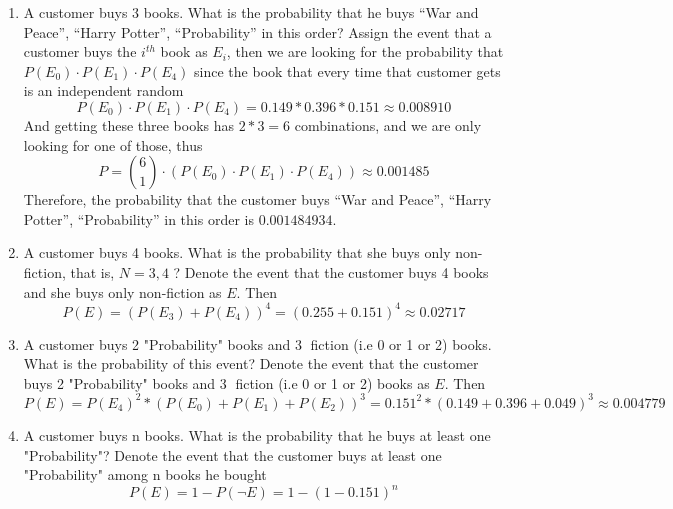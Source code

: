 \documentclass[preprint,12pt]{elsarticle}
\begin{document}
\begin{enumerate}[label=\alph*]
    \item A customer buys 3 books. What is the probability that he buys “War and Peace”, “Harry Potter”, 
    “Probability” in this order?
    Assign the event that a customer buys the $i^{th}$ book as $E_i$, then we are looking for the probability
    that $P(E_0) \cdot P(E_1) \cdot P(E_4)$ since the book that every time that customer gets is an independent random
    \begin{equation*}
        P(E_0) \cdot P(E_1) \cdot P(E_4) = 0.149 * 0.396 * 0.151 \approx 0.008910
    \end{equation*}
    And getting these three books has $2 * 3 = 6$ combinations, and we are only looking for one of those, thus
    \begin{equation*}
        P = \binom{6}{1} \cdot (P(E_0) \cdot P(E_1) \cdot P(E_4)) \approx 0.001485
    \end{equation*}
    Therefore, the probability that the customer buys “War and Peace”, “Harry Potter”, “Probability” in this order
    is $0.001484934$.

    \item A customer buys 4 books. What is the probability that she buys only non-fiction, that is, $N={3, 4}$
    ?
    Denote the event that the customer buys 4 books and she buys only non-fiction as $E$. Then
    \begin{equation*}
        P(E) = (P(E_3) + P(E_4))^4 = (0.255 + 0.151)^4 \approx 0.02717
    \end{equation*}

    \item A customer buys 2 "Probability" books and 3 fiction (i.e 0 or 1 or 2) books. What is the probability
    of this event?
    Denote the event that the customer buys 2 "Probability" books and 3 fiction (i.e 0 or 1 or 2) books as $E$. Then
    \begin{equation*}
        P(E) = P(E_4)^2 * (P(E_0) + P(E_1) + P(E_2))^3 = 0.151^2 * (0.149 + 0.396 + 0.049)^3 \approx 0.004779
    \end{equation*}

    \item A customer buys n books. What is the probability that he buys at least one "Probability"?
    Denote the event that the customer buys at least one "Probability" among n books he bought
    \begin{equation*}
        P(E) = 1 - P(\neg E) = 1 - (1 - 0.151)^n
    \end{equation*}
    \end{enumerate} 
\end{document}
